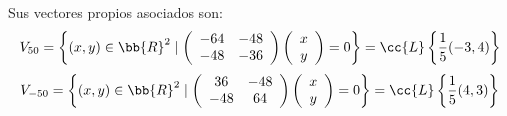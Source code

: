 \begin{ejercicio}
\begin{enumerate}
        Sus vectores propios asociados son:
        \begin{equation*}
            V_{50} = \left\{(x,y)\in \bb{R}^2 \mid \left(\begin{array}{cc}
                -64 & -48 \\
                -48 & -36\\ 
            \end{array}\right)\left(\begin{array}{c}
                x\\y
            \end{array}\right)=0 \right\} = \cc{L}\left\{\frac{1}{5}(-3,4)\right\}
        \end{equation*}
        \begin{equation*}
            V_{-50} = \left\{(x,y)\in \bb{R}^2 \mid \left(\begin{array}{cc}
                36 & -48 \\
                -48 & 64\\ 
            \end{array}\right)\left(\begin{array}{c}
                x\\y
            \end{array}\right)=0 \right\} = \cc{L}\left\{\frac{1}{5}(4,3)\right\}
        \end{equation*}


\end{enumerate}
\end{ejercicio}
